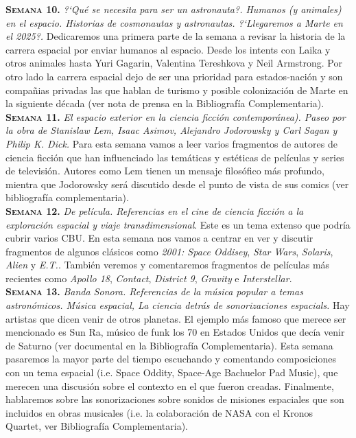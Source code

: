 \documentclass[letterpaper,10pt,onecolumn]{article}
\begin{document}
\noindent\textbf{\textsc{Semana 10.}} \textit{?`Qu\'e se necesita para ser un
astronauta?. Humanos (y animales) en el espacio. Historias  de
cosmonautas y astronautas. ?`Llegaremos a Marte en el 2025?.} Dedicaremos una primera parte de la semana a revisar la historia de la carrera espacial por enviar humanos al espacio. Desde
los intents con Laika y otros animales hasta Yuri Gagarin, Valentina
Tereshkova y Neil Armstrong. Por otro lado la carrera espacial dejo de
ser una prioridad para estados-naci\'on y son compa\~nias privadas las
que hablan de turismo y posible colonizaci\'on de Marte en la
siguiente d\'ecada (ver nota de prensa en la Bibliograf\'ia
Complementaria). \\[-0.3cm]  

\noindent\textbf{\textsc{Semana 11.}} \textit{El espacio exterior en la
ciencia ficci\'on contempor\'anea). Paseo por la obra de Stanislaw Lem,
Isaac Asimov, Alejandro Jodorowsky y Carl Sagan y Philip K. Dick.}
Para esta semana vamos a leer varios fragmentos de  autores de ciencia
ficci\'on que han influenciado las  tem\'aticas y est\'eticas de
pel\'iculas y series de televisi\'on. Autores como Lem tienen un
mensaje filos\'ofico m\'as profundo, mientra que Jodorowsky ser\'a
discutido desde el punto de vista de sus comics (ver bibliograf\'ia
complementaria). \\[-0.3cm]  

\noindent\textbf{\textsc{Semana 12.}} \textit{De pel\'icula. Referencias en el
cine de ciencia ficci\'on a la exploraci\'on espacial y viaje
transdimensional}. Este es un tema extenso que podr\'ia cubrir varios
CBU. En esta semana nos vamos a centrar en ver y discutir fragmentos
de algunos cl\'asicos como \textit{2001: Space Oddisey}, \textit{Star
  Wars}, \textit{Solaris}, \textit{Alien} y 
\textit{E.T.}. Tambi\'en veremos y comentaremos fragmentos de
pel\'iculas m\'as recientes como \textit{Apollo 18}, \textit{Contact},
\textit{District 9}, \textit{Gravity} e
\textit{Interstellar}. \\[-0.3cm]    

\noindent\textbf{\textsc{Semana 13.}} \textit{Banda Sonora. Referencias de la
m\'usica popular a temas astron\'omicos. M\'usica espacial, La ciencia
detr\'as de sonorizaciones espacials.} Hay artistas que dicen venir de
otros planetas. El ejemplo m\'as famoso que merece ser mencionado es
Sun Ra, m\'usico de funk los 70 en Estados Unidos que dec\'ia venir de
Saturno (ver documental en la Bibliograf\'ia Complementaria). Esta
semana pasaremos la mayor parte del tiempo escuchando y comentando composiciones con
un tema espacial (i.e. Space Oddity, Space-Age Bachuelor Pad Music),
que merecen una discusi\'on sobre el contexto en el que fueron
creadas. Finalmente, hablaremos  sobre las sonorizaciones sobre
sonidos de misiones espaciales que son incluidos en obras musicales
(i.e. la colaboraci\'on de NASA con el Kronos Quartet, ver Bibliograf\'ia 
Complementaria).\\[-0.3cm]    
\end{document}
